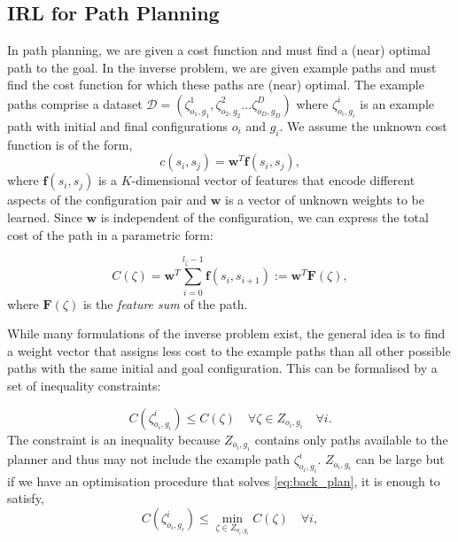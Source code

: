 \documentclass[letterpaper, 10 pt, conference]{ieeeconf}
\begin{document}
\subsection{IRL for Path Planning \label{subsec:inverse_problem}}
In path planning, we are given a cost function and must find a (near) optimal path to the goal. In the inverse problem, we are given example paths and must find the cost function for which these paths are (near) optimal.  The example paths comprise a dataset $\mathcal{D} = (\zeta^1_{o_1,g_1},\zeta^2_{o_2,g_2}...\zeta^D_{o_D,g_D})$ where $\zeta^i_{o_i,g_i}$ is an example path with initial and final configurations $o_i$ and $g_i$. We assume the unknown cost function is of the form,
\begin{equation}
	c(s_i,s_j) = \mathbf{w}^T \mathbf{f}(s_i,s_j), \label{eq:inner_prod}
\end{equation}
where $\mathbf{f}(s_i,s_j)$ is a $K$-dimensional vector of features that encode different aspects of the configuration pair and $\mathbf{w}$ is a vector of unknown weights to be learned. Since $\mathbf{w}$ is independent of the configuration, we can express the total cost of the path in a parametric form:

\begin{equation}
	C(\zeta) = \mathbf{w}^T\sum_{i=0}^{l_{\zeta}-1} \mathbf{f}(s_i,s_{i+1}) := \mathbf{w}^T \mathbf{F}(\zeta),
\end{equation}
where $\mathbf{F}(\zeta)$ is the \emph{feature sum} of the path.

While many formulations of the inverse problem exist, the general idea is to find a weight vector that assigns less cost to the example paths than all other possible paths with the same initial and goal configuration.  This can be formalised by a set of inequality constraints:

\begin{equation}
	C(\zeta^i_{o_i,g_i}) \leq  C(\zeta) \quad \forall \zeta \in Z_{o_i,g_i}  \quad \forall i. \label{eq:const1}
\end{equation}
The constraint is an inequality because $Z_{o_i,g_i}$ contains only paths available to the planner and thus may not include the example path $\zeta^i_{o_i,g_i}$.
$Z_{o_i,g_i}$ can be large but if we have an optimisation procedure that solves \eqref{eq:back_plan}, it is enough to satisfy, 
\begin{equation}
	C(\zeta^i_{o_i,g_i}) \leq \min_{\zeta \in Z_{o_i,g_i}} C(\zeta) \quad \forall i, \label{eq:const}
\end{equation}
\end{document}
